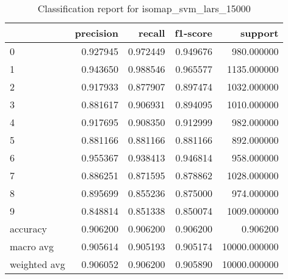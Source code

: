 \begin{table}[htb!]
\centering
\caption{Classification report for isomap_svm_lars_15000}
\label{tab:classification-report-isomap_svm_lars_15000}
\begin{tabular}{lrrrr}
\toprule
 & precision & recall & f1-score & support \\
\midrule
0 & 0.927945 & 0.972449 & 0.949676 & 980.000000 \\
1 & 0.943650 & 0.988546 & 0.965577 & 1135.000000 \\
2 & 0.917933 & 0.877907 & 0.897474 & 1032.000000 \\
3 & 0.881617 & 0.906931 & 0.894095 & 1010.000000 \\
4 & 0.917695 & 0.908350 & 0.912999 & 982.000000 \\
5 & 0.881166 & 0.881166 & 0.881166 & 892.000000 \\
6 & 0.955367 & 0.938413 & 0.946814 & 958.000000 \\
7 & 0.886251 & 0.871595 & 0.878862 & 1028.000000 \\
8 & 0.895699 & 0.855236 & 0.875000 & 974.000000 \\
9 & 0.848814 & 0.851338 & 0.850074 & 1009.000000 \\
accuracy & 0.906200 & 0.906200 & 0.906200 & 0.906200 \\
macro avg & 0.905614 & 0.905193 & 0.905174 & 10000.000000 \\
weighted avg & 0.906052 & 0.906200 & 0.905890 & 10000.000000 \\
\bottomrule
\end{tabular}
\end{table}
